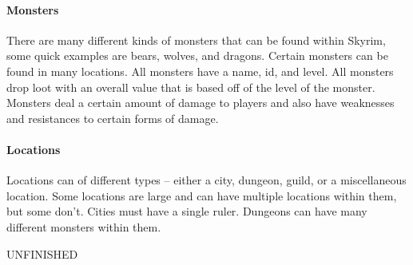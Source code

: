 \paragraph{Monsters}
There are many different kinds of monsters that can be found within Skyrim, some quick examples are bears, wolves, and dragons. Certain monsters can be found in many locations. All monsters have a name, id, and level.  All monsters drop loot with an overall value that is based off of the level of the monster. Monsters deal a certain amount of damage to players and also have weaknesses and resistances to certain forms of damage. 

\paragraph{Locations}
Locations can of different types – either a city, dungeon, guild, or a miscellaneous location. Some locations are large and can have multiple locations within them, but some don’t. Cities must have a single ruler. Dungeons can have many different monsters within them.

\Large UNFINISHED
